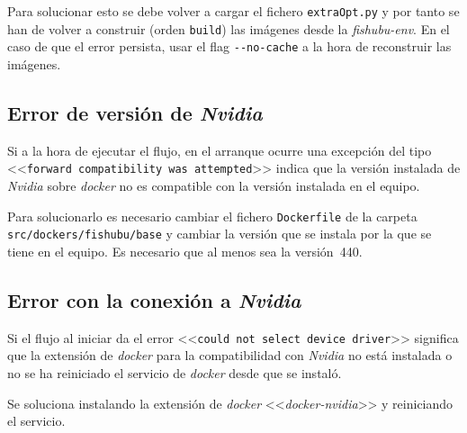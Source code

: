 Para solucionar esto se debe volver a cargar el fichero \texttt{extraOpt.py} y por tanto se han de volver a construir (orden \texttt{build}) las imágenes desde la \textit{fishubu-env}. En el caso de que el error persista, usar el flag \texttt{-{-}no-cache} a la hora de reconstruir las imágenes.

\subsection{Error de versión de \textit{Nvidia}}
Si a la hora de ejecutar el flujo, en el arranque ocurre una excepción del tipo <<\texttt{forward compatibility was attempted}>> indica que la versión instalada de \textit{Nvidia} sobre \textit{docker} no es compatible con la versión instalada en el equipo.

Para solucionarlo es necesario cambiar el fichero \texttt{Dockerfile} de la carpeta \texttt{src/dockers/fishubu/base} y cambiar la versión que se instala por la que se tiene en el equipo. Es necesario que al menos sea la versión~440.

\subsection{Error con la conexión a \textit{Nvidia}}
Si el flujo al iniciar da el error <<\texttt{could not select device driver}>> significa que la extensión de \textit{docker} para la compatibilidad con \textit{Nvidia} no está instalada o no se ha reiniciado el servicio de \textit{docker} desde que se instaló.

Se soluciona instalando la extensión de \textit{docker} <<\textit{docker-nvidia}>> y reiniciando el servicio.